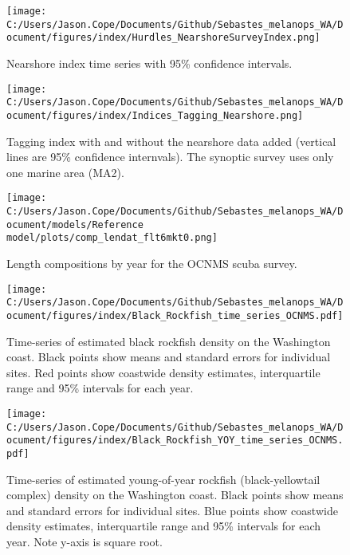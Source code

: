 \documentclass[11pt,
  english,
  letterpaper,
]{article}
\begin{document}
\pagebreak

\begin{figure}
\centering
\texttt{[image: C:/Users/Jason.Cope/Documents/Github/Sebastes\_melanops\_WA/Document/figures/index/Hurdles\_NearshoreSurveyIndex.png]}
\caption{Nearshore index time series with 95\% confidence intervals.\label{fig:nearshore-index}}
\end{figure}

\pagebreak

\begin{figure}
\centering
\texttt{[image: C:/Users/Jason.Cope/Documents/Github/Sebastes\_melanops\_WA/Document/figures/index/Indices\_Tagging\_Nearshore.png]}
\caption{Tagging index with and without the nearshore data added (vertical lines are 95\% confidence internvals). The synoptic survey uses only one marine area (MA2).\label{fig:tag-nearshore-index}}
\end{figure}

\pagebreak

\begin{figure}
\centering
\texttt{[image: C:/Users/Jason.Cope/Documents/Github/Sebastes\_melanops\_WA/Document/models/Reference model/plots/comp\_lendat\_flt6mkt0.png]}
\caption{Length compositions by year for the OCNMS scuba survey.\label{fig:ocnms-ltcomps}}
\end{figure}

\begin{figure}
\centering
\texttt{[image: C:/Users/Jason.Cope/Documents/Github/Sebastes\_melanops\_WA/Document/figures/index/Black\_Rockfish\_time\_series\_OCNMS.pdf]}
\caption{Time-series of estimated black rockfish density on the Washington coast. Black points show means and standard errors for individual sites. Red points show coastwide density estimates, interquartile range and 95\% intervals for each year.\label{fig:ocnms-adult-index}}
\end{figure}

\begin{figure}
\centering
\texttt{[image: C:/Users/Jason.Cope/Documents/Github/Sebastes\_melanops\_WA/Document/figures/index/Black\_Rockfish\_YOY\_time\_series\_OCNMS.pdf]}
\caption{Time-series of estimated young-of-year rockfish (black-yellowtail complex) density on the Washington coast. Black points show means and standard errors for individual sites. Blue points show coastwide density estimates, interquartile range and 95\% intervals for each year. Note y-axis is square root.\label{fig:ocnms-yoy-index}}
\end{figure}
\end{document}
